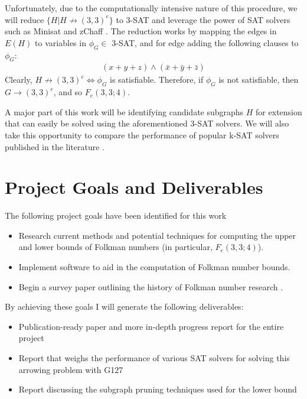 \documentclass[paper=a4, fontsize=11pt]{scrartcl} %
\begin{document}
Unfortunately, due to the computationally intensive nature of this procedure, we will 
reduce $\{H | H \not \to (3,3)^e\}$ to 3-SAT and leverage
the power of SAT solvers such as Minisat \cite{minisat} and zChaff \cite{zchaff}. The reduction works by
mapping the edges in $E(H)$ to variables in $\phi_G \in$ 3-SAT, and for edge adding the following
clauses to $\phi_G$:
\begin{align*}
(x + y + z) \wedge (\bar{x} + \bar{y} + \bar{z})
\end{align*}
Clearly, $H \not \to (3,3)^e \Leftrightarrow \phi_G$ is satisfiable. Therefore, if $\phi_G$ is not satisfiable,
then $G \to (3,3)^e$, and so $F_e(3,3;4)$.

A major part of this work will be identifying candidate subgraphs $H$ for extension that 
can easily be solved using the aforementioned 3-SAT solvers. We will also take this opportunity
to compare the performance of popular k-SAT solvers published in the literature \cite{zchaff} \cite{minisat}.

\section{Project Goals and Deliverables}
The following project goals have been identified for this work
\begin{itemize}
	\item Research current methods and potential techniques for computing the upper and lower bounds of Folkman numbers (in particular, $F_e(3,3;4)$).
	\item Implement software to aid in the computation of Folkman number bounds.
	\item Begin a survey paper outlining the history of Folkman number research \cite{sprSurvey}.
\end{itemize}

By achieving these goals I will generate the following deliverables:
\begin{itemize}
	\item Publication-ready paper and more in-depth progress report for the entire project
	\item Report that weighs the performance of various SAT solvers for solving this arrowing problem with G127
	\item Report discussing the subgraph pruning techniques used for the lower bound
\end{itemize}

\end{document}
